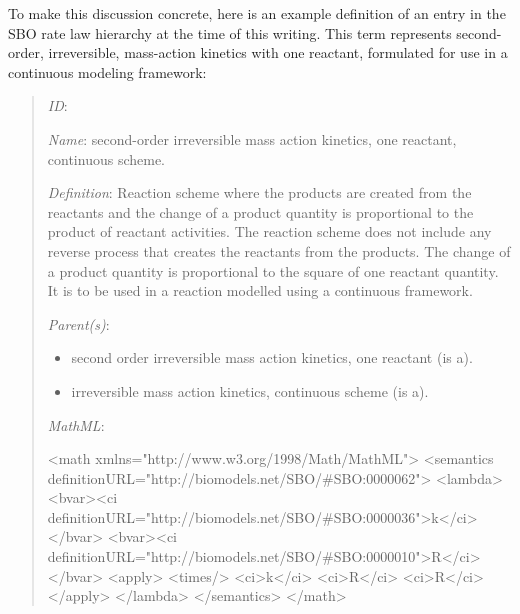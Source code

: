 To make this discussion concrete, here is an example definition of
an entry in the SBO rate law hierarchy at the time of this
writing.  This term represents second-order, irreversible,
mass-action kinetics with one reactant, formulated for use in a
continuous modeling framework:
\begin{quote}
\begin{description}

\item \emph{ID}: 

\item \emph{Name}: second-order irreversible mass action kinetics,
  one reactant, continuous scheme.

\item \emph{Definition}: Reaction scheme where the products are
  created from the reactants and the change of a product quantity
  is proportional to the product of reactant activities. The
  reaction scheme does not include any reverse process that
  creates the reactants from the products. The change of a product
  quantity is proportional to the square of one reactant quantity.
  It is to be used in a reaction modelled using a continuous
  framework.

\item \emph{Parent(s)}: 
  \begin{itemize}
  \item {} second order irreversible mass action
    kinetics, one reactant (is a).
  \item {}
    irreversible mass action kinetics, continuous scheme (is a).
  \end{itemize}
  
\item \emph{MathML}:
\begin{example}
<math xmlns="http://www.w3.org/1998/Math/MathML">
   <semantics definitionURL="http://biomodels.net/SBO/#SBO:0000062">
      <lambda>
         <bvar><ci definitionURL="http://biomodels.net/SBO/#SBO:0000036">k</ci></bvar>
         <bvar><ci definitionURL="http://biomodels.net/SBO/#SBO:0000010">R</ci></bvar>
         <apply>
            <times/>
            <ci>k</ci>
            <ci>R</ci>
            <ci>R</ci>
         </apply>
      </lambda>
   </semantics>
</math>
\end{example}

\end{description}
\end{quote}


